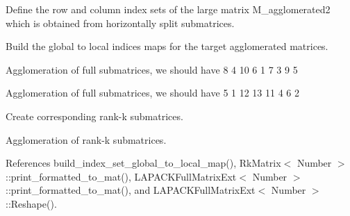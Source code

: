 Define the row and column index sets of the large matrix {\ttfamily M\+\_\+agglomerated2} which is obtained from horizontally split submatrices.

Build the global to local indices maps for the target agglomerated matrices.

Agglomeration of full submatrices, we should have { 8 4 10 6 1 7 3 9 5 }

Agglomeration of full submatrices, we should have { 5 1 12 13 11 4 6 2 }

Create corresponding rank-\/k submatrices.

Agglomeration of rank-\/k submatrices.

References build\+\_\+index\+\_\+set\+\_\+global\+\_\+to\+\_\+local\+\_\+map(), Rk\+Matrix$<$ Number $>$\+::print\+\_\+formatted\+\_\+to\+\_\+mat(), L\+A\+P\+A\+C\+K\+Full\+Matrix\+Ext$<$ Number $>$\+::print\+\_\+formatted\+\_\+to\+\_\+mat(), and L\+A\+P\+A\+C\+K\+Full\+Matrix\+Ext$<$ Number $>$\+::\+Reshape().

